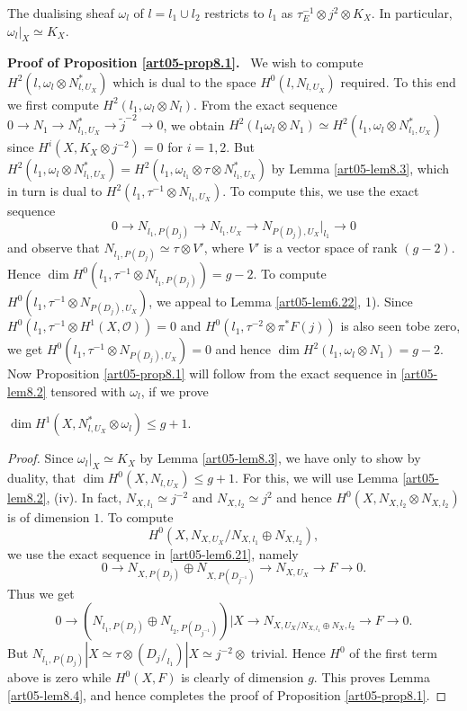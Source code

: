\begin{lemma}\label{art05-lem8.3}
The dualising sheaf $\omega_{l}$ of $l=l_{1}\cup l_{2}$ restricts to
$l_{1}$ as $\tau^{-1}_{E}\otimes j^{2}\otimes K_{X}$. In particular,
$\omega_{l}|_{X}\simeq K_{X}$. 
\end{lemma}

\noindent
{\bf Proof of Proposition \ref{art05-prop8.1}.}~
We wish to compute $H^{2}(l,\omega_{l}\otimes N^{*}_{l,U_{X}})$ which
is dual to the space $H^{0}(l,N_{l,U_{X}})$ required. To this end we
first compute $H^{2}(l_{1},\omega_{l}\otimes N_{l})$. From the exact
sequence $0\to N_{1}\to N^{*}_{l_{1},U_{X}}\to \widetilde{j}^{-2}\to
0$, we obtain $H^{2}(l_{1}\omega_{l}\otimes N_{1})\simeq
H^{2}(l_{1},\omega_{l}\otimes N^{*}_{l_{1},U_{X}})$ since
$H^{i}(X,K_{X}\otimes j^{-2})=0$ for $i=1,2$. But
$H^{2}(l_{1},\omega_{l}\otimes
N^{*}_{l_{1},U_{X}})=H^{2}(l_{1},\omega_{l_{1}}\otimes \tau \otimes
N^{*}_{l_{1},U_{X}})$ by Lemma \ref{art05-lem8.3}, which in turn is
dual to $H^{2}(l_{1},\tau^{-1}\otimes N_{l_{1},U_{X}})$. To compute
this, we use the exact sequence
$$
0\to N_{l_{1},P(D_{j})}\to N_{l_{1},U_{X}}\to
N_{P(D_{j}),U_{X}}|_{l_{1}}\to 0
$$
and observe that $N_{l_{1},P(D_{j})}\simeq \tau\otimes V'$, where $V'$
is a vector space of rank $(g-2)$. Hence $\dim
H^{0}(l_{1},\tau^{-1}\otimes N_{l_{1},P(D_{j})})=g-2$. To compute
$H^{0}(l_{1},\tau^{-1}\otimes N_{P(D_{j}),U_{X}})$, we appeal to Lemma 
\ref{art05-lem6.22}, 1). Since $H^{0}(l_{1},\tau^{-1}\otimes
H^{1}(X,\mathscr{O}))=0$ and
$H^{0}(l_{1},\tau^{-2}\otimes \pi^{*}F(j))$ is also seen
to\pageoriginale be zero, we get $H^{0}(l_{1},\tau^{-1}\otimes
N_{P(D_{j}),U_{X}})=0$ and hence $\dim H^{2}(l_{1},\omega_{l}\otimes
N_{1})=g-2$. Now Proposition \ref{art05-prop8.1} will follow from the
exact sequence in \ref{art05-lem8.2} tensored with $\omega_{l}$, if we
prove

\begin{lemma}\label{art05-lem8.4}
$\dim H^{1}(X,N^{*}_{l,U_{X}}\otimes \omega_{l})\leq g+1$.
\end{lemma}

\begin{proof}
Since $\omega_{l}|_{X}\simeq K_{X}$ by Lemma \ref{art05-lem8.3}, we
have only to show by duality, that $\dim H^{0}(X,N_{l,U_{X}})\leq
g+1$. For this, we will use Lemma \ref{art05-lem8.2}, (iv). In fact,
$N_{X,l_{1}}\simeq j^{-2}$ and $N_{X,l_{2}}\simeq j^{2}$ and hence
$H^{0}(X,N_{X,l_{2}}\otimes N_{X,l_{2}})$ is of dimension $1$. To
compute 
$$
H^{0}(X,N_{X,U_{X}}/N_{X,l_{1}}\oplus N_{X,l_{2}}),
$$ 
we use
the exact sequence in \ref{art05-lem6.21}, namely
$$
0\to N_{X,P(D_{j})}\oplus N_{X,P(D_{j^{-1}})}\to N_{X,U_{X}}\to F\to 0.
$$
Thus we get
$$
0\to (N_{l_{1},P(D_{j})}\oplus N_{l_{2},P(D_{j^{-1}})})|X\to
N_{X,U_{X}/N_{X,l_{1}}\oplus N_{X},l_{2}}\to F\to 0.
$$
But $N_{l_{1},P(D_{j})}|X\simeq \tau\otimes (D_{j}/_{l_{1}})|X\simeq
j^{-2}\otimes$ trivial. Hence $H^{0}$ of the first term above is zero
while $H^{0}(X,F)$ is clearly of dimension $g$. This proves
Lemma \ref{art05-lem8.4}, and hence completes the proof of
Proposition \ref{art05-prop8.1}. 
\end{proof}

